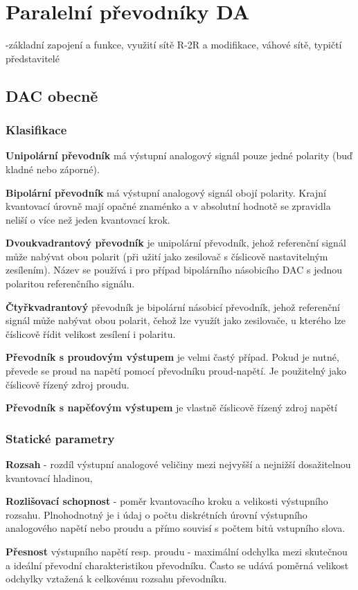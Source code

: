 \section{Paralelní převodníky DA}
-základní zapojení a funkce, využití sítě R-2R a modifikace, váhové sítě, typičtí představitelé
\subsection{DAC obecně}
\subsubsection{Klasifikace}
\textbf{Unipolární převodník} má výstupní analogový signál pouze jedné polarity (buď kladné
nebo záporné).

\textbf{Bipolární převodník} má výstupní analogový signál obojí polarity. Krajní kvantovací
úrovně mají opačné znaménko a v absolutní hodnotě se zpravidla neliší o více než jeden
kvantovací krok.

\textbf{Dvoukvadrantový převodník} je unipolární převodník, jehož referenční signál může
nabývat obou polarit (při užití jako zesilovač s číslicově nastavitelným zesílením). Název se
používá i pro případ bipolárního násobicího DAC s jednou polaritou referenčního signálu.

\textbf{Čtyřkvadrantový} převodník je bipolární násobicí převodník, jehož referenční signál
může nabývat obou polarit, čehož lze využít jako zesilovače, u kterého lze číslicově řídit
velikost zesílení i polaritu.

\textbf{Převodník s proudovým výstupem} je velmi častý případ. Pokud je nutné, převede se
proud na napětí pomocí převodníku proud-napětí. Je použitelný jako číslicově řízený zdroj
proudu.

\textbf{Převodník s napěťovým výstupem} je vlastně číslicově řízený zdroj napětí

\subsubsection{Statické parametry}
\textbf{Rozsah} - rozdíl výstupní analogové veličiny mezi nejvyšší a
nejnižší dosažitelnou kvantovací hladinou,

\textbf{Rozlišovací schopnost} - poměr kvantovacího kroku a velikosti
výstupního rozsahu. Plnohodnotný je i údaj o počtu diskrétních
úrovní výstupního analogového napětí nebo proudu a přímo
souvisí s počtem bitů vstupního slova.

\textbf{Přesnost} výstupního napětí resp. proudu - maximální odchylka
mezi skutečnou a ideální převodní charakteristikou převodníku.
Často se udává poměrná velikost odchylky vztažená
k celkovému rozsahu převodníku.

